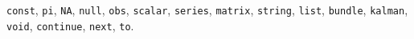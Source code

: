 \texttt{const}, \texttt{pi}, \texttt{NA}, \texttt{null}, \texttt{obs}, \texttt{scalar}, \texttt{series}, \texttt{matrix}, \texttt{string}, \texttt{list}, \texttt{bundle}, \texttt{kalman}, \texttt{void}, \texttt{continue}, \texttt{next}, \texttt{to}.

